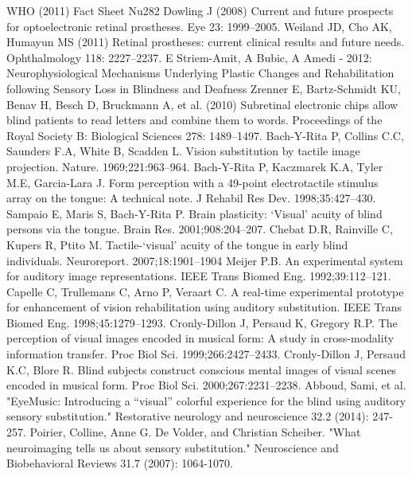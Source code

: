 \documentclass{article}
\begin{document}
\begin{thebibliography}{9}
  WHO (2011) Fact Sheet Nu282
Dowling J (2008) Current and future prospects for optoelectronic retinal prostheses. Eye 23: 1999–2005.
Weiland JD, Cho AK, Humayun MS (2011) Retinal prostheses: current clinical results and future needs. Ophthalmology 118: 2227–2237.
E Striem-Amit, A Bubic, A Amedi - 2012: Neurophysiological Mechanisms Underlying Plastic Changes and Rehabilitation following Sensory Loss in Blindness and Deafness
Zrenner E, Bartz-Schmidt KU, Benav H, Besch D, Bruckmann A, et al. (2010) Subretinal electronic chips allow blind patients to read letters and combine them to words. Proceedings of the Royal Society B: Biological Sciences 278: 1489–1497.
Bach-Y-Rita P, Collins C.C, Saunders F.A, White B, Scadden L. Vision substitution by tactile image projection. Nature. 1969;221:963–964. 
Bach-Y-Rita P, Kaczmarek K.A, Tyler M.E, Garcia-Lara J. Form perception with a 49-point electrotactile stimulus array on the tongue: A technical note. J Rehabil Res Dev. 1998;35:427–430.
Sampaio E, Maris S, Bach-Y-Rita P. Brain plasticity: ‘Visual’ acuity of blind persons via the tongue. Brain Res. 2001;908:204–207. 
Chebat D.R, Rainville C, Kupers R, Ptito M. Tactile-‘visual’ acuity of the tongue in early blind individuals. Neuroreport. 2007;18:1901–1904
Meijer P.B. An experimental system for auditory image representations. IEEE Trans Biomed Eng. 1992;39:112–121.
Capelle C, Trullemans C, Arno P, Veraart C. A real-time experimental prototype for enhancement of vision rehabilitation using auditory substitution. IEEE Trans Biomed Eng. 1998;45:1279–1293. 
Cronly-Dillon J, Persaud K, Gregory R.P. The perception of visual images encoded in musical form: A study in cross-modality information transfer. Proc Biol Sci. 1999;266:2427–2433. 
Cronly-Dillon J, Persaud K.C, Blore R. Blind subjects construct conscious mental images of visual scenes encoded in musical form. Proc Biol Sci. 2000;267:2231–2238.
Abboud, Sami, et al. "EyeMusic: Introducing a “visual” colorful experience for the blind using auditory sensory substitution." Restorative neurology and neuroscience 32.2 (2014): 247-257.
Poirier, Colline, Anne G. De Volder, and Christian Scheiber. "What neuroimaging tells us about sensory substitution." Neuroscience and Biobehavioral Reviews 31.7 (2007): 1064-1070.

\end{thebibliography}
\end{document}
